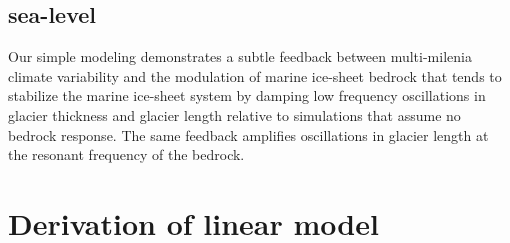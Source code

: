 \documentclass[tc, manuscript]{copernicus}
\begin{document}
\subsection{sea-level}


\conclusions  
Our simple modeling demonstrates a subtle feedback between multi-milenia climate variability and the modulation of marine ice-sheet bedrock that tends to stabilize the marine ice-sheet system by damping low frequency oscillations in glacier thickness and glacier length relative to simulations that assume no bedrock response. 
The same feedback amplifies oscillations in glacier length at the resonant frequency of the bedrock.









\appendix
\section{Derivation of linear model}    %
\end{document}
